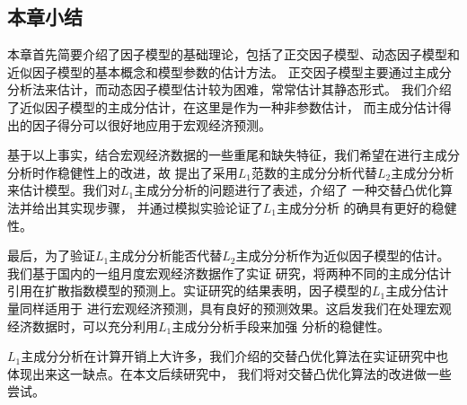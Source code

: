 \subsection{本章小结}
本章首先简要介绍了因子模型的基础理论，包括了正交因子模型、动态因子模型和近似因子模型的基本概念和模型参数的估计方法。
正交因子模型主要通过主成分分析法来估计，而动态因子模型估计较为困难，常常估计其静态形式。
我们介绍了近似因子模型的主成分估计，在这里是作为一种非参数估计，
而主成分估计得出的因子得分可以很好地应用于宏观经济预测。

基于以上事实，结合宏观经济数据的一些重尾和缺失特征，我们希望在进行主成分分析时作稳健性上的改进，故
提出了采用$L_1$范数的主成分分析代替$L_2$主成分分析来估计模型。我们对$L_1$主成分分析的问题进行了表述，介绍了
一种交替凸优化算法并给出其实现步骤，
并通过模拟实验论证了$L_1$主成分分析
的确具有更好的稳健性。

最后，为了验证$L_1$主成分分析能否代替$L_2$主成分分析作为近似因子模型的估计。我们基于国内的一组月度宏观经济数据作了实证
研究，将两种不同的主成分估计引用在扩散指数模型的预测上。实证研究的结果表明，因子模型的$L_1$主成分估计量同样适用于
进行宏观经济预测，具有良好的预测效果。这启发我们在处理宏观经济数据时，可以充分利用$L_1$主成分分析手段来加强
分析的稳健性。

$L_1$主成分分析在计算开销上大许多，我们介绍的交替凸优化算法在实证研究中也体现出来这一缺点。在本文后续研究中，
我们将对交替凸优化算法的改进做一些尝试。